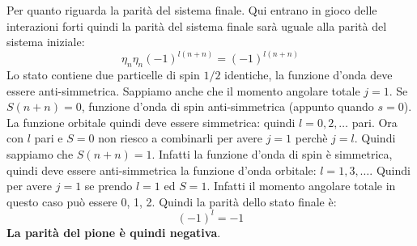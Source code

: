 Per quanto riguarda la parità del sistema finale. Qui entrano in gioco delle interazioni forti quindi la parità del sistema finale sarà uguale alla parità del sistema iniziale:
\begin{equation*}
    \eta_n\eta_n(-1)^{l(n+n)}=(-1)^{l(n+n)}
\end{equation*}
Lo stato contiene due particelle di spin $1/2$ identiche, la funzione d'onda deve essere anti-simmetrica. Sappiamo anche che il momento angolare totale $j=1$. Se $S(n+n)=0$, funzione d'onda di spin anti-simmetrica (appunto quando $s=0$). La funzione orbitale quindi deve essere simmetrica: quindi $l=0,2,\ldots$ pari. Ora con $l$ pari e $S=0$ non riesco a combinarli per avere $j=1$ perchè $j=l$. Quindi sappiamo che $S(n+n)=1$. Infatti la funzione d'onda di spin è simmetrica, quindi deve essere anti-simmetrica la funzione d'onda orbitale: $l=1,3,\ldots$. Quindi per avere $j=1$ se prendo $l=1$ ed $S=1$. Infatti il momento angolare totale in questo caso può essere 0, 1, 2. Quindi la parità dello stato finale è:
\begin{equation*}
    (-1)^l=-1
\end{equation*}
\textbf{La parità del pione è quindi negativa}.
